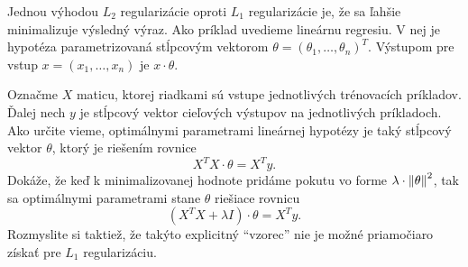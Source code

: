 \begin{exercise}
  Jednou výhodou $L_2$ regularizácie oproti $L_1$ regularizácie je, že
  sa ľahšie minimalizuje výsledný výraz. Ako príklad uvedieme lineárnu
  regresiu. V nej je hypotéza parametrizovaná stĺpcovým vektorom
  $\theta = (\theta_1, \ldots, \theta_n)^T$. Výstupom pre vstup
  $x = (x_1, \ldots, x_n)$ je $x \cdot \theta$. 
  
  Označme $X$ maticu, ktorej riadkami sú vstupe jednotlivých trénovacích
  príkladov. Ďalej nech $y$ je stĺpcový vektor cieľových výstupov na
  jednotlivých príkladoch. Ako určite vieme, optimálnymi parametrami
  lineárnej hypotézy je taký stĺpcový vektor $\theta$, ktorý je riešením
  rovnice
  $$X^T X \cdot \theta = X^T y.$$
  Dokáže, že keď k minimalizovanej hodnote pridáme pokutu vo forme
  $\lambda \cdot \left\lVert\theta\right\rVert^2$, tak sa optimálnymi parametrami stane
  $\theta$ riešiace rovnicu
  $$(X^T X + \lambda I) \cdot \theta = X^T y.$$
  Rozmyslite si taktiež, že takýto explicitný ``vzorec'' nie je možné
  priamočiaro získať pre $L_1$ regularizáciu.
\end{exercise}
